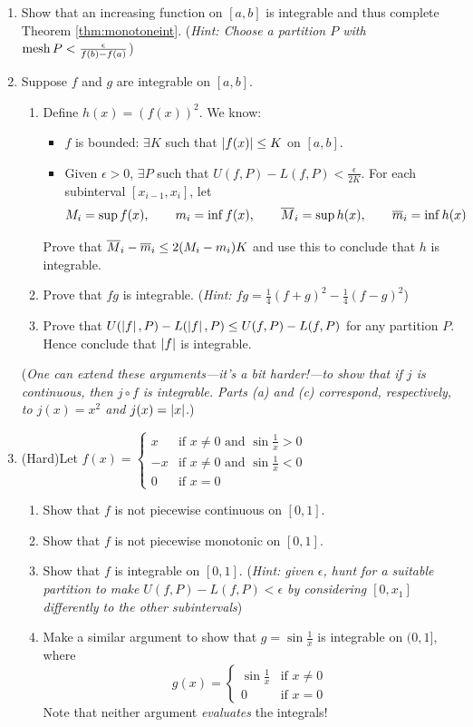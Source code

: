 \begin{exercises}
\begin{enumerate}
  \item Show that an increasing function on $[a,b]$ is integrable and thus complete Theorem \ref{thm:monotoneint}.\smallbreak
  (\emph{Hint: Choose a partition $P$ with $\operatorname{mesh} P<\frac\epsilon{f(b)-f(a)}$})
 
  
  \item Suppose $f$ and $g$ are integrable on $[a,b]$.
	\begin{enumerate}
    \item Define $h(x)=(f(x))^2$. We know:
  	\begin{itemize}
    	\item $f$ is bounded: $\exists K$ such that $\left| f(x)\right|\le K$ on $[a,b]$.
    	\item Given $\epsilon>0$, $\exists P$ such that $U(f,P)-L(f,P)<\frac\epsilon{2K}$.
  		For each subinterval $[x_{i-1},x_i]$, let
  		\[M_i=\sup f(x),\qquad m_i=\inf f(x),\qquad \overline{M}_i=\sup h(x),\qquad \overline{m}_i=\inf h(x)\]
  	\end{itemize}
  	Prove that $\overline{M}_i-\overline{m}_i\le 2(M_i-m_i)K$ and use this to conclude that $h$ is integrable.
  	\item Prove that $fg$ is integrable.\smallbreak
  	(\emph{Hint: $fg=\frac 14(f+g)^2-\frac 14(f-g)^2$})
  	\item Prove that $U(\left| f\right|,P)-L(\left| f\right|,P)\le U(f,P)-L(f,P)$ for any partition $P$. Hence conclude that $\left| f\right|$ is integrable.
  \end{enumerate}
  (\emph{One can extend these arguments---it's a bit harder!---to show that if $j$ is continuous, then $j\circ f$ is integrable. Parts (a) and (c) correspond, respectively, to $j(x)=x^2$ and $j(x)=\left| x\right|$.})
  
    
  
  
  \item (Hard)\quad Let $f(x)=\begin{cases}
  x&\text{if }x\neq 0\text{ and }\sin\frac 1x>0\\
  -x&\text{if }x\neq 0\text{ and }\sin\frac 1x<0\\
  0&\text{if }x=0 
  \end{cases}$
  \begin{enumerate}
  	\item Show that $f$ is not piecewise continuous on $[0,1]$.
    \item Show that $f$ is not piecewise monotonic on $[0,1]$.
    \item Show that $f$ is integrable on $[0,1]$.\smallbreak
    (\emph{Hint: given $\epsilon$, hunt for a suitable partition to make $U(f,P)-L(f,P)<\epsilon$ by considering $[0,x_1]$ differently to the other subintervals})
    \item Make a similar argument to show that $g=\sin\frac 1x$ is integrable on $(0,1]$, where
    \[g(x)=\begin{cases}
    \sin\frac 1x&\text{if }x\neq 0\\
    0&\text{if }x=0
    \end{cases}\]
    Note that neither argument \emph{evaluates} the integrals!
  \end{enumerate}


\end{enumerate}
\end{exercises}
